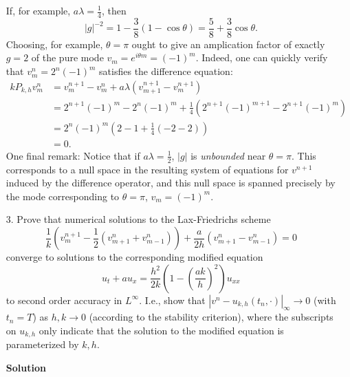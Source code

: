 \documentclass{article}
\providecommand{\abs}[1]{\left\lvert#1\right\rvert}
\begin{document}
\begin{itemize}
If, for example, $a \lambda = \frac{1}{4}$, then
\begin{equation*}
\abs{g}^{-2} = 1 - \frac{3}{8} \left( 1 - \cos \theta \right) = \frac{5}{8} + \frac{3}{8} \cos \theta.
\end{equation*}
Choosing, for example, $\theta = \pi$ ought to give an amplication factor of exactly $g = 2$ of the pure mode $v_m = e^{i \theta m} = (-1)^m$. Indeed, one can quickly verify that $v^n_m = 2^n (-1)^m$ satisfies the difference equation:
\begin{align*}
k P_{k,h} v^n_m
 & = v^{n+1}_m - v^n_m + a \lambda \left( v^{n+1}_{m+1} - v^{n+1}_m \right) \\
 & = 2^{n+1} (-1)^m - 2^n (-1)^m + \frac{1}{4} \left( 2^{n+1} (-1)^{m+1} - 2^{n+1} (-1)^m \right) \\
 & = 2^n (-1)^m \left( 2 - 1 + \frac{1}{4} \left( -2 -2 \right) \right) \\
 & = 0.
\end{align*}
One final remark: Notice that if $a \lambda = \frac{1}{2}$, $\abs{g}$ is \emph{unbounded} near $\theta = \pi$. This corresponds to a null space in the resulting system of equations for $v^{n+1}$ induced by the difference operator, and this null space is spanned precisely by the mode corresponding to $\theta = \pi$, $v_m = (-1)^m$.

\item[3.] Prove that numerical solutions to the Lax-Friedrichs scheme
\begin{equation*}
\frac{1}{k} \left( v^{n+1}_m - \frac{1}{2} \left( v^n_{m+1} + v^n_{m-1} \right) \right) + \frac{a}{2h} \left( v^n_{m+1} - v^n_{m-1} \right) = 0
\end{equation*}
converge to solutions to the corresponding modified equation
\begin{equation*}
u_t + a u_x = \frac{h^2}{2k} \left( 1 - \left( \frac{a k}{h} \right)^2 \right) u_{xx}
\end{equation*}
to second order accuracy in $L^{\infty}$. I.e., show that $\abs{v^n - u_{k,h} \left( t_n, \cdot \right)}_{\infty} \to 0$ (with $t_n = T$) as $h,k \to 0$ (according to the stability criterion), where the subscripts on $u_{k,h}$ only indicate that the solution to the modified equation is parameterized by $k,h$.

\textbf{Solution}


\end{itemize}
\end{document}
